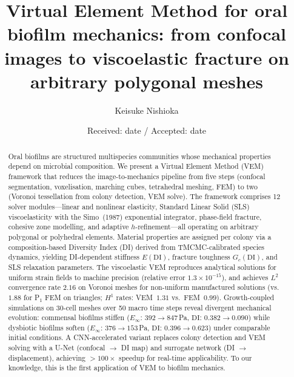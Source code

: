 \documentclass[smallextended]{svjour3}
\newcommand{\DI}{\mathrm{DI}}
\begin{document}
\title{Virtual Element Method for oral biofilm mechanics:
from confocal images to viscoelastic fracture
on arbitrary polygonal meshes}

\author{Keisuke Nishioka}

{}

\date{Received: date / Accepted: date}

\maketitle

\begin{abstract}
Oral biofilms are structured multispecies communities whose mechanical
properties depend on microbial composition.
We present a Virtual Element Method (VEM) framework that reduces the
image-to-mechanics pipeline from five steps (confocal segmentation,
voxelisation, marching cubes, tetrahedral meshing, FEM) to two
(Voronoi tessellation from colony detection, VEM solve).
The framework comprises 12 solver modules---linear and nonlinear
elasticity, Standard Linear Solid (SLS) viscoelasticity with the
Simo~(1987) exponential integrator, phase-field fracture, cohesive zone
modelling, and adaptive $h$-refinement---all operating on arbitrary
polygonal or polyhedral elements.
Material properties are assigned per colony via a composition-based
Diversity Index (DI) derived from TMCMC-calibrated species dynamics,
yielding DI-dependent stiffness $E(\DI)$, fracture toughness $G_c(\DI)$,
and SLS relaxation parameters.
The viscoelastic VEM reproduces analytical solutions for uniform strain
fields to machine precision (relative error $1.3\times10^{-15}$), and
achieves $L^2$ convergence rate $2.16$ on Voronoi meshes for
non-uniform manufactured solutions (vs.\ $1.88$ for P$_1$ FEM on
triangles; $H^1$ rates: VEM~$1.31$ vs.\ FEM~$0.99$).
Growth-coupled simulations on 30-cell meshes over 50 macro time steps
reveal divergent mechanical evolution:
commensal biofilms stiffen ($E_\infty$: $392\to847$\,Pa,
$\DI$: $0.382\to0.090$) while
dysbiotic biofilms soften ($E_\infty$: $376\to153$\,Pa,
$\DI$: $0.396\to0.623$) under comparable initial conditions.
A CNN-accelerated variant replaces colony detection and VEM solving
with a U-Net (confocal $\to$ DI map) and surrogate network
(DI $\to$ displacement), achieving $>100\times$ speedup for real-time
applicability.
To our knowledge, this is the first application of VEM to biofilm
mechanics.
\end{abstract}
\end{document}
